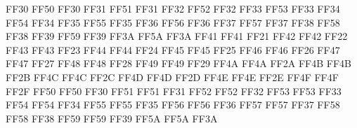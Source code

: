 \setcclcucx FF30 FF50 FF30 %
\setcclcucx FF31 FF51 FF31 %
\setcclcucx FF32 FF52 FF32 %
\setcclcucx FF33 FF53 FF33 %
\setcclcucx FF34 FF54 FF34 %
\setcclcucx FF35 FF55 FF35 %
\setcclcucx FF36 FF56 FF36 %
\setcclcucx FF37 FF57 FF37 %
\setcclcucx FF38 FF58 FF38 %
\setcclcucx FF39 FF59 FF39 %
\setcclcucx FF3A FF5A FF3A %
\setcclcucx FF41 FF41 FF21 %
\setcclcucx FF42 FF42 FF22 %
\setcclcucx FF43 FF43 FF23 %
\setcclcucx FF44 FF44 FF24 %
\setcclcucx FF45 FF45 FF25 %
\setcclcucx FF46 FF46 FF26 %
\setcclcucx FF47 FF47 FF27 %
\setcclcucx FF48 FF48 FF28 %
\setcclcucx FF49 FF49 FF29 %
\setcclcucx FF4A FF4A FF2A %
\setcclcucx FF4B FF4B FF2B %
\setcclcucx FF4C FF4C FF2C %
\setcclcucx FF4D FF4D FF2D %
\setcclcucx FF4E FF4E FF2E %
\setcclcucx FF4F FF4F FF2F %
\setcclcucx FF50 FF50 FF30 %
\setcclcucx FF51 FF51 FF31 %
\setcclcucx FF52 FF52 FF32 %
\setcclcucx FF53 FF53 FF33 %
\setcclcucx FF54 FF54 FF34 %
\setcclcucx FF55 FF55 FF35 %
\setcclcucx FF56 FF56 FF36 %
\setcclcucx FF57 FF57 FF37 %
\setcclcucx FF58 FF58 FF38 %
\setcclcucx FF59 FF59 FF39 %
\setcclcucx FF5A FF5A FF3A %

\endinput

